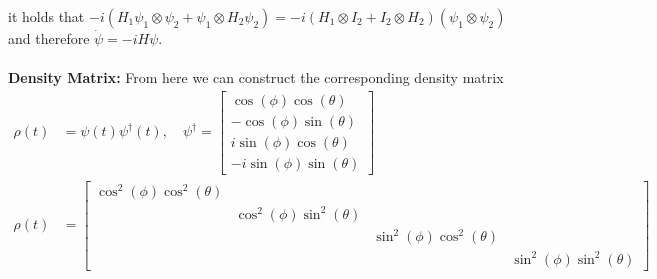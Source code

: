 \documentclass[11pt]{article}
\begin{document}
it holds that $-i(H_1\psi_1\otimes \psi_2 + \psi_1\otimes H_2\psi_2) = -i(H_1\otimes I_2 + I_2 \otimes H_2)(\psi_1 \otimes \psi_2)$ and therefore $\dot{\psi} = -iH\psi$.\\\\
\textbf{Density Matrix:}
From here we can construct the corresponding density matrix
\begin{align}
    \rho(t) &= \psi(t)\psi^\dag(t), \quad \psi^\dag = \begin{bmatrix} \cos(\phi)\cos(\theta)\\-\cos(\phi)\sin(\theta)\\i\sin(\phi)\cos(\theta)\\-i\sin(\phi)\sin(\theta) \end{bmatrix}\\
    \rho(t) &= \begin{bmatrix}
                \cos^2(\phi)\cos^2(\theta) & & & \\
                & \cos^2(\phi)\sin^2(\theta) & & \\
                & & \sin^2(\phi)\cos^2(\theta) & \\
                & & & \sin^2(\phi)\sin^2(\theta)
            \end{bmatrix}
\end{align}
\end{document}
